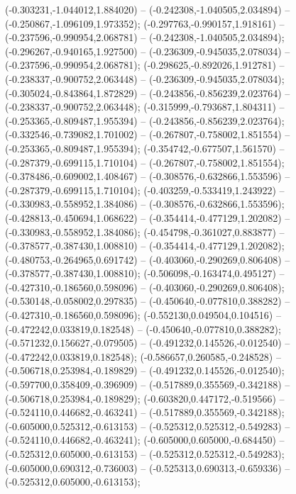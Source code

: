  (-0.303231,-1.044012,1.884020) -- (-0.242308,-1.040505,2.034894) -- (-0.250867,-1.096109,1.973352);
 (-0.297763,-0.990157,1.918161) -- (-0.237596,-0.990954,2.068781) -- (-0.242308,-1.040505,2.034894);
 (-0.296267,-0.940165,1.927500) -- (-0.236309,-0.945035,2.078034) -- (-0.237596,-0.990954,2.068781);
 (-0.298625,-0.892026,1.912781) -- (-0.238337,-0.900752,2.063448) -- (-0.236309,-0.945035,2.078034);
 (-0.305024,-0.843864,1.872829) -- (-0.243856,-0.856239,2.023764) -- (-0.238337,-0.900752,2.063448);
 (-0.315999,-0.793687,1.804311) -- (-0.253365,-0.809487,1.955394) -- (-0.243856,-0.856239,2.023764);
 (-0.332546,-0.739082,1.701002) -- (-0.267807,-0.758002,1.851554) -- (-0.253365,-0.809487,1.955394);
 (-0.354742,-0.677507,1.561570) -- (-0.287379,-0.699115,1.710104) -- (-0.267807,-0.758002,1.851554);
 (-0.378486,-0.609002,1.408467) -- (-0.308576,-0.632866,1.553596) -- (-0.287379,-0.699115,1.710104);
 (-0.403259,-0.533419,1.243922) -- (-0.330983,-0.558952,1.384086) -- (-0.308576,-0.632866,1.553596);
 (-0.428813,-0.450694,1.068622) -- (-0.354414,-0.477129,1.202082) -- (-0.330983,-0.558952,1.384086);
 (-0.454798,-0.361027,0.883877) -- (-0.378577,-0.387430,1.008810) -- (-0.354414,-0.477129,1.202082);
 (-0.480753,-0.264965,0.691742) -- (-0.403060,-0.290269,0.806408) -- (-0.378577,-0.387430,1.008810);
 (-0.506098,-0.163474,0.495127) -- (-0.427310,-0.186560,0.598096) -- (-0.403060,-0.290269,0.806408);
 (-0.530148,-0.058002,0.297835) -- (-0.450640,-0.077810,0.388282) -- (-0.427310,-0.186560,0.598096);
 (-0.552130,0.049504,0.104516) -- (-0.472242,0.033819,0.182548) -- (-0.450640,-0.077810,0.388282);
 (-0.571232,0.156627,-0.079505) -- (-0.491232,0.145526,-0.012540) -- (-0.472242,0.033819,0.182548);
 (-0.586657,0.260585,-0.248528) -- (-0.506718,0.253984,-0.189829) -- (-0.491232,0.145526,-0.012540);
 (-0.597700,0.358409,-0.396909) -- (-0.517889,0.355569,-0.342188) -- (-0.506718,0.253984,-0.189829);
 (-0.603820,0.447172,-0.519566) -- (-0.524110,0.446682,-0.463241) -- (-0.517889,0.355569,-0.342188);
 (-0.605000,0.525312,-0.613153) -- (-0.525312,0.525312,-0.549283) -- (-0.524110,0.446682,-0.463241);
 (-0.605000,0.605000,-0.684450) -- (-0.525312,0.605000,-0.613153) -- (-0.525312,0.525312,-0.549283);
 (-0.605000,0.690312,-0.736003) -- (-0.525313,0.690313,-0.659336) -- (-0.525312,0.605000,-0.613153);
